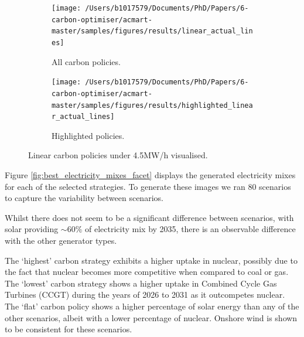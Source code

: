 \documentclass[sigconf]{acmart}
\begin{document}
%





\begin{figure}
\begin{subfigure}[h]{0.6\linewidth}
\texttt{[image: /Users/b1017579/Documents/PhD/Papers/6-carbon-optimiser/acmart-master/samples/figures/results/linear\_actual\_lines]}
\caption{All carbon policies.}
\label{fig:linear_actual_pdcs}
\end{subfigure}
\hfill
\begin{subfigure}[h]{0.39\linewidth}
\texttt{[image: /Users/b1017579/Documents/PhD/Papers/6-carbon-optimiser/acmart-master/samples/figures/results/highlighted\_linear\_actual\_lines]}
\caption{Highlighted policies.}
\label{fig:highlighted_linear_actual_strategies}
\end{subfigure}%
\caption{Linear carbon policies under \textsterling4.5MW/h visualised.}
\end{figure}



Figure \ref{fig:best_electricity_mixes_facet} displays the generated electricity mixes for each of the selected strategies. To generate these images we ran 80 scenarios to capture the variability between scenarios. 

Whilst there does not seem to be a significant difference between scenarios, with solar providing ${\sim}60\%$ of electricity mix by 2035, there is an observable difference with the other generator types.

The `highest' carbon strategy exhibits a higher uptake in nuclear, possibly due to the fact that nuclear becomes more competitive when compared to coal or gas. The `lowest' carbon strategy shows a higher uptake in Combined Cycle Gas Turbines (CCGT) during the years of 2026 to 2031 as it outcompetes nuclear. The `flat' carbon policy shows a higher percentage of solar energy than any of the other scenarios, albeit with a lower percentage of nuclear. Onshore wind is shown to be consistent for these scenarios.
\end{document}
